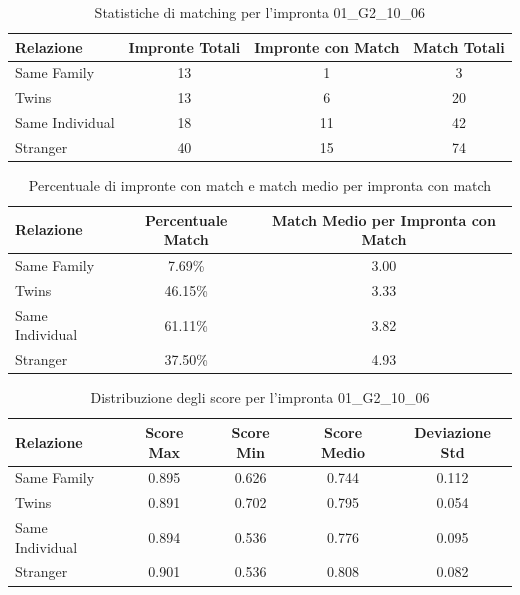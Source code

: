 \begin{table}[htbp]
\centering
\caption{Statistiche di matching per l'impronta 01\_G2\_10\_06}
\label{tab:results_01_G2_10_06}
\begin{tabular}{|l|c|c|c|}
\hline
\textbf{Relazione} & \textbf{Impronte Totali} & \textbf{Impronte con Match} & \textbf{Match Totali} \\
\hline
Same Family & 13 & 1 & 3 \\
\hline
Twins & 13 & 6 & 20 \\
\hline
Same Individual & 18 & 11 & 42 \\
\hline
Stranger & 40 & 15 & 74 \\
\hline
\end{tabular}
\end{table}


\begin{table}[htbp]
\centering
\caption{Percentuale di impronte con match e match medio per impronta con match}
\label{tab:match_percentage_01_G2_10_06}
\begin{tabular}{|l|c|c|}
\hline
\textbf{Relazione} & \textbf{Percentuale Match} & \textbf{Match Medio per Impronta con Match} \\
\hline
Same Family & 7.69\% & 3.00 \\
\hline
Twins & 46.15\% & 3.33 \\
\hline
Same Individual & 61.11\% & 3.82 \\
\hline
Stranger & 37.50\% & 4.93 \\
\hline
\end{tabular}
\end{table}


\begin{table}[htbp]
\centering
\caption{Distribuzione degli score per l'impronta 01\_G2\_10\_06}
\label{tab:scores_01_G2_10_06}
\begin{tabular}{|l|c|c|c|c|}
\hline
\textbf{Relazione} & \textbf{Score Max} & \textbf{Score Min} & \textbf{Score Medio} & \textbf{Deviazione Std} \\
\hline
Same Family & 0.895 & 0.626 & 0.744 & 0.112 \\
\hline
Twins & 0.891 & 0.702 & 0.795 & 0.054 \\
\hline
Same Individual & 0.894 & 0.536 & 0.776 & 0.095 \\
\hline
Stranger & 0.901 & 0.536 & 0.808 & 0.082 \\
\hline
\end{tabular}
\end{table}

